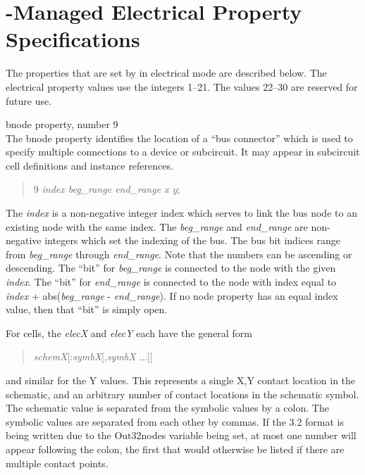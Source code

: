 \section{{\Xic}-Managed Electrical Property Specifications}
\label{branchprop}

The properties that are set by {\Xic} in electrical mode are described
below.  The electrical property values use the integers 1--21.  The
values 22--30 are reserved for future use.

\begin{description}
\item{\et bnode} property, number 9\\
The {\et bnode} property identifies the location of a ``bus
connector'' which is used to specify multiple connections to a device
or subcircuit.  It may appear in subcircuit cell definitions and
instance references.

\begin{quote}{ 9} {\it index beg\_range end\_range x y};
\end{quote}

The {\it index} is a non-negative integer index which serves to link
the bus node to an existing node with the same index.  The {\it
beg\_range} and {\it end\_range} are non-negative integers which set
the indexing of the bus.  The bus bit indices range from {\it
beg\_range} through {\it end\_range}.  Note that the numbers can be
ascending or descending.  The ``bit'' for {\it beg\_range} is
connected to the node with the given {\it index}.  The ``bit'' for
{\it end\_range} is connected to the node with index equal to {\it
index} + {\vt abs(}{\it beg\_range} - {\it end\_range\/}{\vt )}.  If
no node property has an equal index value, then that ``bit'' is simply
open.

For cells, the {\it elecX} and {\it elecY} each have the general form
\begin{quote}
{\it schemX\/}[{\vt :}{\it symbX\/}[{\vt ,}{\it symbX} ...]]
\end{quote}
and similar for the Y values.  This represents a single X,Y contact
location in the schematic, and an arbitrary number of contact
locations in the schematic symbol.  The schematic value is separated
from the symbolic values by a colon.  The symbolic values are
separated from each other by commas.  If the 3.2 format is being
written due to the {\et Out32nodes} variable being set, at most one
number will appear following the colon, the first that would otherwise
be listed if there are multiple contact points.


\end{description}
